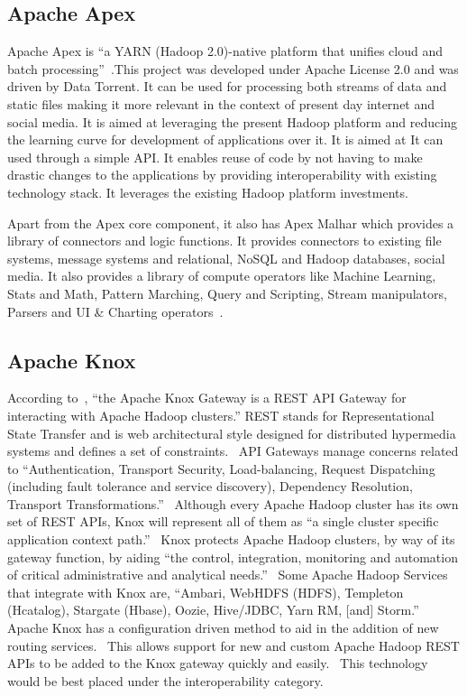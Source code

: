 \subsection{Apache Apex}
     
Apache Apex is ``a YARN (Hadoop 2.0)-native platform that unifies
cloud and batch processing''~\cite{www-apacheapexwiki}.This project
was developed under Apache License 2.0 and was driven by Data
Torrent. It can be used for processing both streams of data and static
files making it more relevant in the context of present day internet
and social media. It is aimed at leveraging the present Hadoop
platform and reducing the learning curve for development of
applications over it. It is aimed at It can used through a simple
API. It enables reuse of code by not having to make drastic changes to
the applications by providing interoperability with existing
technology stack. It leverages the existing Hadoop platform
investments.

Apart from the Apex core component, it also has Apex Malhar which
provides a library of connectors and logic functions. It provides
connectors to existing file systems, message systems and relational,
NoSQL and Hadoop databases, social media. It also provides a library
of compute operators like Machine Learning, Stats and Math, Pattern
Marching, Query and Scripting, Stream manipulators, Parsers and UI \&
Charting operators~\cite{www-apacheapexblog}.

\subsection{Apache Knox \cv}

According to~\cite{knox}, ``the Apache Knox Gateway is a REST API
Gateway for interacting with Apache Hadoop clusters.'' REST stands for
Representational State Transfer and is web architectural style
designed for distributed hypermedia systems and defines a set of
constraints.~\cite{fielding} API Gateways manage concerns related to
``Authentication, Transport Security, Load-balancing, Request
Dispatching (including fault tolerance and service discovery),
Dependency Resolution, Transport Transformations.''~\cite{peyrott}
Although every Apache Hadoop cluster has its own set of REST APIs,
Knox will represent all of them as ``a single cluster specific
application context path.''~\cite{knox} Knox protects Apache Hadoop
clusters, by way of its gateway function, by aiding ``the control,
integration, monitoring and automation of critical administrative and
analytical needs.''~\cite{knox} Some Apache Hadoop Services that
integrate with Knox are, ``Ambari, WebHDFS (HDFS), Templeton
(Hcatalog), Stargate (Hbase), Oozie, Hive/JDBC, Yarn RM, [and]
Storm.''~\cite{knox} Apache Knox has a configuration driven method to
aid in the addition of new routing services.~\cite{knox} This allows
support for new and custom Apache Hadoop REST APIs to be added to the
Knox gateway quickly and easily.~\cite{knox} This technology would be
best placed under the interoperability category.

